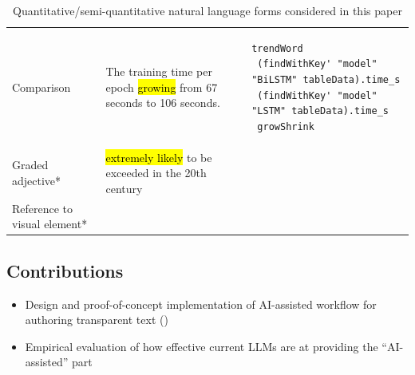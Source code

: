 \begin{table}[!ht]
\begin{tabular}{>{\raggedright\arraybackslash}p{2cm} >{\raggedright\arraybackslash}p{5cm} >{\raggedright\arraybackslash}p{6cm}}
        Comparison
        & The training time per epoch \hl{growing} from 67 seconds to 106 seconds. &
        \begin{lstlisting}[language=Fluid,numbers=none]
trendWord
 (findWithKey' "model" "BiLSTM" tableData).time_s
 (findWithKey' "model" "LSTM" tableData).time_s
 growShrink
        \end{lstlisting} \\
        Graded adjective*            & \hl{extremely likely} to be exceeded in the 20th century               & ~                             \\
        Reference to visual element*                            & ~                & ~                             \\
        \hline
    \end{tabular}
    \caption{Quantitative/semi-quantitative natural language forms considered in this paper}
    \label{tab:fluid_examples}
\end{table}
\subsection{Contributions}

\begin{itemize}
    \item Design and proof-of-concept implementation of AI-assisted workflow for authoring transparent text
    ()
    \item Empirical evaluation of how effective current LLMs are at providing the ``AI-assisted'' part
\end{itemize}
